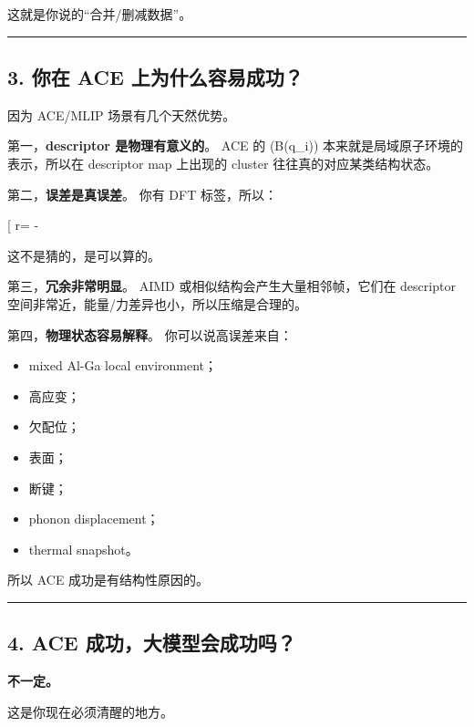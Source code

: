 \documentclass[
  12pt,
]{ctexart}
\providecommand{\tightlist}{%
  \setlength{\itemsep}{0pt}\setlength{\parskip}{0pt}}
\begin{document}
这就是你说的``合并/删减数据''。

\begin{center}\rule{0.5\linewidth}{0.5pt}\end{center}

\subsection{3. 你在 ACE
上为什么容易成功？}\label{ux4f60ux5728-ace-ux4e0aux4e3aux4ec0ux4e48ux5bb9ux6613ux6210ux529f}

因为 ACE/MLIP 场景有几个天然优势。

第一，\textbf{descriptor 是物理有意义的}。 ACE 的 (B(q\_i))
本来就是局域原子环境的表示，所以在 descriptor map 上出现的 cluster
往往真的对应某类结构状态。

第二，\textbf{误差是真误差}。 你有 DFT 标签，所以：

{[} r=  - \text{DFT label}{]}

这不是猜的，是可以算的。

第三，\textbf{冗余非常明显}。 AIMD 或相似结构会产生大量相邻帧，它们在
descriptor 空间非常近，能量/力差异也小，所以压缩是合理的。

第四，\textbf{物理状态容易解释}。 你可以说高误差来自：

\begin{itemize}
\tightlist
\item
  mixed Al-Ga local environment；
\item
  高应变；
\item
  欠配位；
\item
  表面；
\item
  断键；
\item
  phonon displacement；
\item
  thermal snapshot。
\end{itemize}

所以 ACE 成功是有结构性原因的。

\begin{center}\rule{0.5\linewidth}{0.5pt}\end{center}

\subsection{4. ACE
成功，大模型会成功吗？}\label{ace-ux6210ux529fux5927ux6a21ux578bux4f1aux6210ux529fux5417}

\textbf{不一定。}

这是你现在必须清醒的地方。
\end{document}
